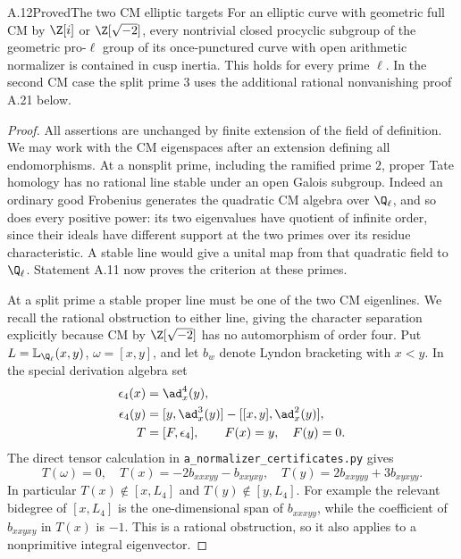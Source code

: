 \begin{statement}{A.12}{Proved}{The two CM elliptic targets}
For an elliptic curve with geometric full CM
by $\Z[i]$ or $\Z[\sqrt{-2}]$, every nontrivial closed procyclic
subgroup of the geometric pro-$\ell$ group of its once-punctured curve
with open arithmetic normalizer is contained in cusp inertia.
This holds for every prime $\ell$. In the second CM case the split
prime $3$ uses the additional rational nonvanishing proof A.21 below.
\end{statement}
\begin{proof}
All assertions are unchanged by finite extension of the field of
definition. We may work with the CM eigenspaces after an extension
defining all endomorphisms.
At a nonsplit prime, including the ramified prime $2$, proper Tate
homology has no rational line stable under an open Galois subgroup.
Indeed an ordinary good Frobenius generates the quadratic CM algebra
over $\Q_\ell$, and so does every positive power: its two eigenvalues
have quotient of infinite order, since their ideals have different
support at the two primes over its residue characteristic. A stable
line would give a unital map from that quadratic field to $\Q_\ell$.
Statement A.11 now proves the criterion at these primes.

At a split prime a stable proper line must be one of the two CM
eigenlines. We recall the rational obstruction to either line, giving
the character separation explicitly because CM by $\Z[\sqrt{-2}]$
has no automorphism of order four. Put $L=\mathbb L_{\Q_\ell}(x,y)$,
$\omega=[x,y]$, and let $b_w$ denote Lyndon bracketing with $x<y$.
In the special derivation algebra set
\[
\begin{aligned}
 \epsilon_4(x)&=\ad_x^4(y),\\
 \epsilon_4(y)&=[y,\ad_x^3(y)]-[[x,y],\ad_x^2(y)],\\
 T&=[F,\epsilon_4],\qquad F(x)=y,\quad F(y)=0.
\end{aligned}
\]
The direct tensor calculation in \texttt{a\_normalizer\_certificates.py}
gives
\[
 T(\omega)=0,\quad
 T(x)=-2b_{xxxyy}-b_{xxyxy},\quad
 T(y)=2b_{xxyyy}+3b_{xyxyy}.                    \tag{A.15}
\]
In particular $T(x)\notin[x,L_4]$ and $T(y)\notin[y,L_4]$.
For example the relevant bidegree of $[x,L_4]$ is the one-dimensional
span of $b_{xxxyy}$, while the coefficient of $b_{xxyxy}$ in $T(x)$
is $-1$. This is a rational obstruction, so it also applies to a
nonprimitive integral eigenvector.


\end{proof}
